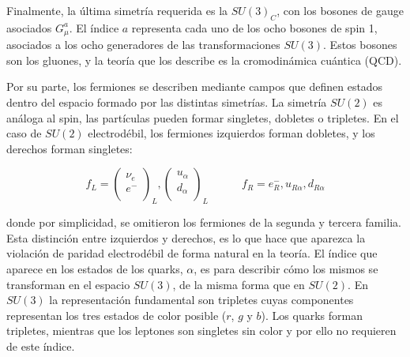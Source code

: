 Finalmente, la última simetría requerida es la $SU(3)_C$, con los bosones de gauge asociados $G_{\mu}^{a}$. El índice $a$ representa cada uno de los ocho bosones de spin 1, asociados a los ocho generadores de las transformaciones $SU(3)$. Estos bosones son los gluones, y la teoría que los describe es la cromodinámica cuántica (QCD).

Por su parte, los fermiones se describen mediante campos que definen estados dentro del espacio formado por las distintas simetrías. La simetría $SU(2)$ es análoga al spin, 
las partículas pueden formar singletes, dobletes o tripletes. %
En el caso de $SU(2)$ electrodébil, los fermiones izquierdos forman dobletes, y los derechos forman singletes:

\begin{equation}
	f_L = 
	\begin{pmatrix}
	\nu_{e} \\
	e^{-} \\
	\end{pmatrix}_{L},
	\begin{pmatrix}
	u_\alpha \\
	d_\alpha \\
	\end{pmatrix}_{L}
	\quad\quad\quad
	f_R = e^{-}_{R},u_{R\alpha},d_{R\alpha}
\end{equation}

\noindent
donde por simplicidad, se omitieron los fermiones de la segunda y tercera familia.
Esta distinción entre izquierdos y derechos, es lo que hace que aparezca la violación de paridad electrodébil de forma natural en la teoría. El índice que aparece en los estados de los quarks, $\alpha$, es para describir cómo los mismos se transforman en el espacio $SU(3)$, de la misma forma que en $SU(2)$. En $SU(3)$ la representación fundamental son tripletes cuyas componentes representan los tres estados de color posible ($r$, $g$ y $b$). Los quarks forman tripletes,  mientras que los leptones son singletes sin color y por ello no requieren de este índice.



